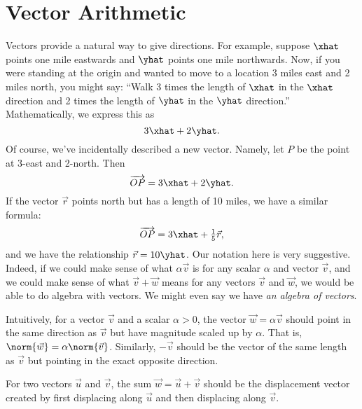 \section{Vector Arithmetic}
\label{SECVECTORPROPS}
Vectors provide a natural way to give directions.
For example, suppose $\xhat$ points one mile eastwards and $\yhat$
points one mile northwards.  Now, if you were standing at the origin
and wanted to move to a location 3 miles east and 2 miles north, you might say:
``Walk 3 times the length of $\xhat$  in the $\xhat$ direction and 2 times
the length of $\yhat$ in the $\yhat$ direction.''  Mathematically, we express this
as
\[
	3\xhat+2\yhat.
\]
Of course, we've incidentally described a new vector.  Namely, let $P$
be the point at 3-east and 2-north.  Then
\[
	\overrightarrow{OP}=3\xhat+2\yhat.
\]
If the vector $\vec r$ points north but has a length of 10 miles, we have
a similar formula:
\[
	\overrightarrow{OP}=3\xhat+\tfrac{1}{5}\vec r,
\]
and we have the relationship $\vec r=10\yhat$.
Our notation here is very suggestive.  Indeed, if we could make
sense of what $\alpha\vec v$ is for any scalar $\alpha$ and vector
$\vec v$, and we could make sense of what $\vec v+\vec w$
means for any vectors $\vec v$ and $\vec w$, we would be able to
do algebra with vectors.  We might even say we have \emph{an algebra
of vectors}.

Intuitively, for a vector $\vec v$ and a scalar $\alpha>0$, the
vector $\vec w=\alpha\vec v$ should point in the same direction as
$\vec v$ but have magnitude scaled up by $\alpha$.  That is, $\norm{\vec w}=\alpha\norm{\vec v}$.
Similarly, $-\vec v$ should be the vector of the same length as $\vec v$ but
pointing in the exact opposite direction.

\begin{center}
	\usetikzlibrary{patterns,decorations.pathreplacing}
\end{center}

For two vectors $\vec u$ and $\vec v$, the sum $\vec w=\vec u+\vec v$
should be the displacement vector created by first displacing along $\vec u$
and then displacing along $\vec v$.

